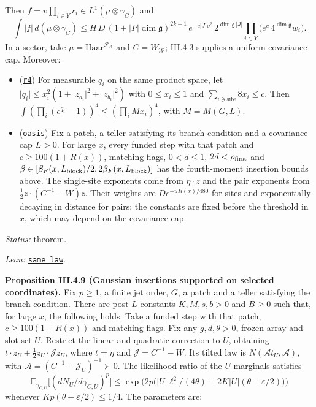 \documentclass[
  letterpaper,
  11pt]{article}
\providecommand{\tightlist}{%
  \setlength{\itemsep}{0pt}\setlength{\parskip}{0pt}}
\begin{document}
Then \(f=v\prod_{i\in Y}r_i\in L^1(\mu\otimes\gamma_C)\) and
\[\int\lvert f\rvert\,d(\mu\otimes\gamma_C)\le H\,D\,(1+\lvert P\rvert\dim\mathfrak g)^{2k+1}\,e^{-c\lvert J\rvert\rho^2}\,2^{\dim\mathfrak g\,\lvert J\rvert}\prod_{i\in Y}\big(e^{c}\,4^{\dim\mathfrak g}w_i\big).\]
In a sector, take \(\mu=\mathrm{Haar}^{\mathcal F_A}\) and
\(C=W_{\mathcal W}\); III.4.3 supplies a uniform covariance cap.
Moreover:

\begin{itemize}
\tightlist
\item
  (\href{https://github.com/yang-mills-group/OpenAI-YM-20261028/blob/3456e5e75cf8d4cd558955a5c7638fba2d68f464/YM/AnalyticBridge/ANNULUS_RATIO_INSERTIONS/Ember.lean\#L69-L111}{\texttt{r4}})
  For measurable \(q_i\) on the same product space, let
  \(\lvert q_i\rvert\le x_i^2(1+\lvert z_{a_i}\rvert^2+\lvert z_{b_i}\rvert^2)\)
  with \(0\le x_i\le1\) and \(\sum_{i\ni\text{site}}8x_i\le c\). Then
  \(\int(\prod_i(e^{q_i}-1))^4\le(\prod_iMx_i)^4\), with \(M=M(G,L)\).
\item
  (\href{https://github.com/yang-mills-group/OpenAI-YM-20261028/blob/3456e5e75cf8d4cd558955a5c7638fba2d68f464/YM/AnalyticBridge/ANNULUS_RATIO_INSERTIONS/Echo.lean\#L191-L223}{\texttt{oasis}})
  Fix a patch, a teller satisfying its branch condition and a covariance
  cap \(L>0\). For large \(x\), every funded step with that patch and
  \(c\ge100(1+R(x))\), matching flags, \(0<d\le1\),
  \(2d<\rho_{\rm first}\) and
  \(\beta\in[\beta_F(x,L_{\rm block})/2,2\beta_F(x,L_{\rm block})]\) has
  the fourth-moment insertion bounds above. The single-site exponents
  come from \(\eta\cdot z\) and the pair exponents from
  \(\tfrac12z\cdot(C^{-1}-W)z\). Their weights are \(De^{-uR(x)/480}\)
  for sites and exponentially decaying in distance for pairs; the
  constants are fixed before the threshold in \(x\), which may depend on
  the covariance cap.
\end{itemize}

\emph{Status:} theorem.

\emph{Lean:}
\href{https://github.com/yang-mills-group/OpenAI-YM-20261028/blob/3456e5e75cf8d4cd558955a5c7638fba2d68f464/YM/AnalyticBridge/ANNULUS_RATIO_INSERTIONS/Arc.lean\#L189-L253}{\texttt{same\_law}}.

\textbf{Proposition III.4.9 (Gaussian insertions supported on selected
coordinates).} Fix \(p\ge1\), a finite jet order, \(G\), a patch and a
teller satisfying the branch condition. There are post-\(L\) constants
\(K,M,s,b>0\) and \(B\ge0\) such that, for large \(x\), the following
holds. Take a funded step with that patch, \(c\ge100(1+R(x))\) and
matching flags. Fix any \(g,d,\theta>0\), frozen array and slot set
\(U\). Restrict the linear and quadratic correction to \(U\), obtaining
\(t\cdot z_U+\tfrac12z_U\cdot\mathcal Jz_U\), where \(t=\eta\) and
\(\mathcal J=C^{-1}-W\). Its tilted law is
\(N(\mathcal A t_U,\mathcal A)\), with
\(\mathcal A=(C^{-1}-\mathcal J_U)^{-1}\succ0\). The likelihood ratio of
the \(U\)-marginals satisfies
\[\mathbb E_{\gamma_{C,U}}\big[(dN_U/d\gamma_{C,U})^{p}\big]\le\exp\!\Big(2p\big(\lvert U\rvert\ell^2/(4\theta)+2K\lvert U\rvert(\theta+\varepsilon/2)\big)\Big)\]
whenever \(Kp(\theta+\varepsilon/2)\le1/4\). The parameters are:
\end{document}
